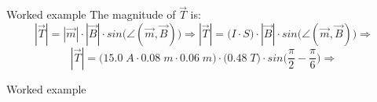 {\begin{frame}{Worked example}
{\small
         The magnitude of $\vec{T}$  is:
         \begin{equation*}
            |\vec{T}| = |\vec{m}| \cdot |\vec{B}| \cdot  sin\Big( \angle(\vec{m},\vec{B}) \Big) \Rightarrow
            |\vec{T}| = \Big( I \cdot S \Big) \cdot |\vec{B}| \cdot  sin\Big( \angle(\vec{m},\vec{B}) \Big) \Rightarrow
         \end{equation*}
         \begin{equation*}
            |\vec{T}| = \Big( 15.0 \; A \cdot 0.08 \; m  \cdot 0.06 \; m \Big) \cdot \Big( 0.48 \; T \Big)
               \cdot  sin \Big( \frac{\pi}{2} - \frac{\pi}{6} \Big) \Rightarrow
         \end{equation*}
}

\end{frame}

%
%
%

\begin{frame}{Worked example}


\end{frame}}
